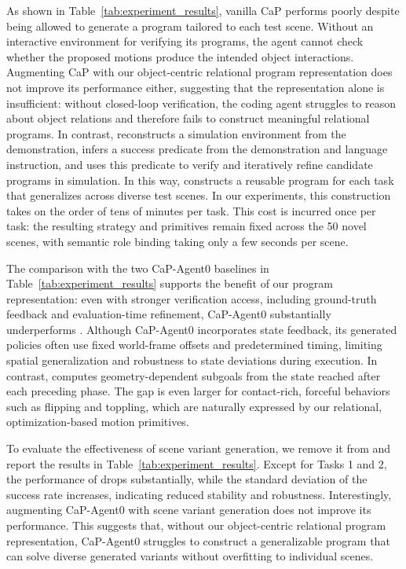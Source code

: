  As shown in Table~\ref{tab:experiment_results}, vanilla CaP performs poorly despite being allowed to generate a program tailored to each test scene. Without an interactive environment for verifying its programs, the agent cannot check whether the proposed motions produce the intended object interactions. Augmenting CaP with our object-centric relational program representation does not improve its performance either, suggesting that the representation alone is insufficient: without closed-loop verification, the coding agent struggles to reason about object relations and therefore fails to construct meaningful relational programs. In contrast, \ours reconstructs a simulation environment from the demonstration, infers a success predicate from the demonstration and language instruction, and uses this predicate to verify and iteratively refine candidate programs in simulation. In this way, \ours constructs a reusable program for each task that generalizes across diverse test scenes. In our experiments, this construction takes on the order of tens of minutes per task. This cost is incurred once per task: the resulting strategy and primitives remain fixed across the 50 novel scenes, with semantic role binding taking only a few seconds per scene.

 The comparison with the two CaP-Agent0 baselines in Table~\ref{tab:experiment_results} supports the benefit of our program representation: even with stronger verification access, including ground-truth feedback and evaluation-time refinement, CaP-Agent0 substantially underperforms \ours. Although CaP-Agent0 incorporates state feedback, its generated policies often use fixed world-frame offsets and predetermined timing, limiting spatial generalization and robustness to state deviations during execution. In contrast, \ours computes geometry-dependent subgoals from the state reached after each preceding phase. The gap is even larger for contact-rich, forceful behaviors such as flipping and toppling, which are naturally expressed by our relational, optimization-based motion primitives.

 To evaluate the effectiveness of scene variant generation, we remove it from \ours and report the results in Table~\ref{tab:experiment_results}. Except for Tasks 1 and 2, the performance of \ours drops substantially, while the standard deviation of the success rate increases, indicating reduced stability and robustness. Interestingly, augmenting CaP-Agent0 with scene variant generation does not improve its performance. This suggests that, without our object-centric relational program representation, CaP-Agent0 struggles to construct a generalizable program that can solve diverse generated variants without overfitting to individual scenes.

